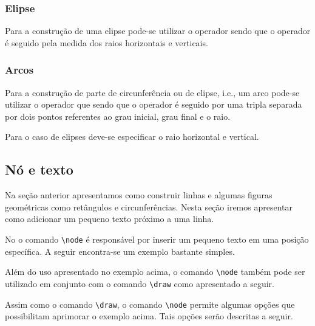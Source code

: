 \subsubsection{Elipse}
Para a constru\c{c}\~{a}o de uma elipse pode-se utilizar o operador  sendo que o operador \'{e} seguido pela medida dos raios horizontais e verticais. \\

\subsubsection{Arcos}
Para a constru\c{c}\~{a}o de parte de circunfer\^{e}ncia ou de elipse, i.e., um arco pode-se utilizar o operador  que sendo que o operador \'{e} seguido por uma tripla separada por dois pontos referentes ao grau inicial, grau final e o raio. \\

Para o caso de elipses deve-se especificar o raio horizontal e vertical. \\

\subsection{N\'{o} e texto}
Na se\c{c}\~{a}o anterior apresentamos como construir linhas e algumas figuras geom\'{e}tricas como ret\^{a}ngulos e circunfer\^{e}ncias. Nesta se\c{c}\~{a}o iremos apresentar como adicionar um pequeno texto pr\'{o}ximo a uma linha.

No \TikZ o comando \lstinline!\node! \'{e} respons\'{a}vel por inserir um pequeno texto em uma posi\c{c}\~{a}o espec\'{i}fica. A seguir encontra-se um exemplo bastante simples. \\

Al\'{e}m do uso apresentado no exemplo acima, o comando \lstinline!\node! tamb\'{e}m pode ser utilizado em conjunto com o comando \lstinline!\draw! como apresentado a seguir. \\

Assim como o comando \lstinline!\draw!, o comando \lstinline!\node! permite algumas op\c{c}\~{o}es que possibilitam aprimorar o exemplo acima. Tais op\c{c}\~{o}es ser\~{a}o descritas a seguir.

